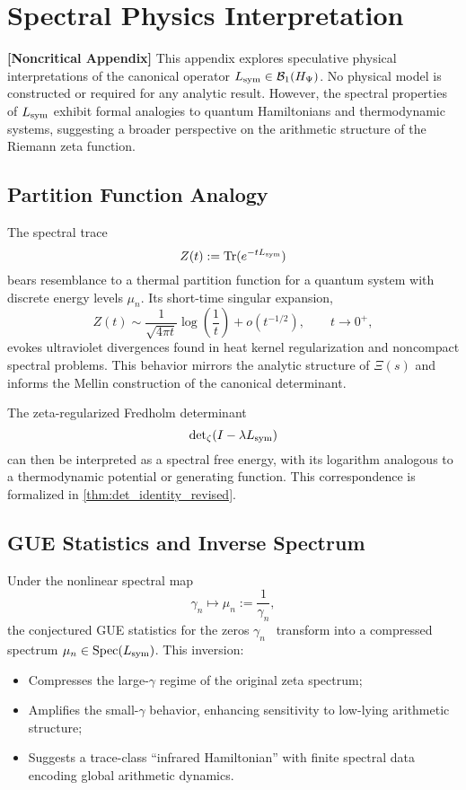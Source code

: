 \section{Spectral Physics Interpretation}
\label{app:spectral_physics_link}

\noindent\textbf{[Noncritical Appendix]}  
This appendix explores speculative physical interpretations of the canonical operator \( L_{\mathrm{sym}} \in \mathcal{B}_1(H_{\Psi}) \). No physical model is constructed or required for any analytic result. However, the spectral properties of \( L_{\mathrm{sym}} \) exhibit formal analogies to quantum Hamiltonians and thermodynamic systems, suggesting a broader perspective on the arithmetic structure of the Riemann zeta function.

\subsection*{Partition Function Analogy}

The spectral trace
\[
Z(t) := \operatorname{Tr}(e^{-t L_{\mathrm{sym}}})
\]
bears resemblance to a thermal partition function for a quantum system with discrete energy levels \( \mu_n \). Its short-time singular expansion,
\[
Z(t) \sim \frac{1}{\sqrt{4\pi t}} \log\left( \frac{1}{t} \right) + o(t^{-1/2}), \qquad t \to 0^+,
\]
evokes ultraviolet divergences found in heat kernel regularization and noncompact spectral problems. This behavior mirrors the analytic structure of \( \Xi(s) \) and informs the Mellin construction of the canonical determinant.

The zeta-regularized Fredholm determinant
\[
\det\nolimits_{\zeta}(I - \lambda L_{\mathrm{sym}})
\]
can then be interpreted as a spectral free energy, with its logarithm analogous to a thermodynamic potential or generating function. This correspondence is formalized in \cref{thm:det_identity_revised}.

\subsection*{GUE Statistics and Inverse Spectrum}

Under the nonlinear spectral map
\[
\gamma_n \longmapsto \mu_n := \frac{1}{\gamma_n},
\]
the conjectured GUE statistics for the zeros \( \gamma_n \)~\cite{Montgomery1973PairCorrelation, Berry1986RiemannSpectra} transform into a compressed spectrum \( \mu_n \in \operatorname{Spec}(L_{\mathrm{sym}}) \). This inversion:
\begin{itemize}
  \item Compresses the large-\( \gamma \) regime of the original zeta spectrum;
  \item Amplifies the small-\( \gamma \) behavior, enhancing sensitivity to low-lying arithmetic structure;
  \item Suggests a trace-class “infrared Hamiltonian” with finite spectral data encoding global arithmetic dynamics.
\end{itemize}

